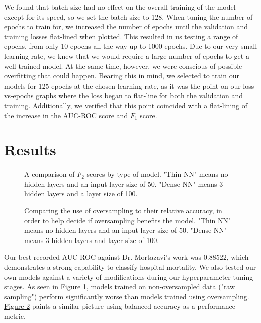 \documentclass{article}
\begin{document}
We found that batch size had no effect on the overall training of the model except for its speed, so we set the batch size to 128. When 
tuning the number of epochs to train for, we increased the number of epochs until the validation and training losses flat-lined when 
plotted. This resulted in us testing a range of epochs, from only 10 epochs all the way up to 1000 epochs. Due to our very small learning
rate, we knew that we would require a large number of epochs to get a well-trained model. At the same time, however, we were conscious of 
possible overfitting that could happen. Bearing this in mind, we selected to train our models for 125 epochs at the chosen learning rate,
as it was the point on our loss-vs-epochs graphs where the loss began to flat-line for both the validation and training. Additionally, we 
verified that this point coincided with a flat-lining of the increase in the AUC-ROC score and $F_1$ score.


\section{Results}
\begin{figure}[h]
    \noindent{}
    \caption{A comparison of $F_2$ scores by type of model. "Thin NN" means no hidden layers and an input layer size of 50. "Dense NN" means 3 hidden layers and a layer size of 100.}
    \label{fig:1}
\end{figure}


\begin{figure}[H]
    \centering
    \noindent{}
    \caption{Comparing the use of oversampling to their relative accuracy, in order to help decide if oversampling benefits the model. "Thin NN" means no hidden layers and an input layer size of 50. "Dense NN" means 3 hidden layers and layer size of 100.}
    \label{fig:2}
\end{figure}

Our best recorded AUC-ROC against Dr. Mortazavi's work was 0.88522, which demonstrates a strong capability to classify hospital mortality.
We also tested our own models against a variety of modifications during our hyperparameter tuning stages. 
As seen in \hyperref[fig:1]{Figure 1}, models trained on non-oversampled data ("raw sampling") perform significantly worse than models 
trained using oversampling. \hyperref[fig:2]{Figure 2} paints a similar picture using balanced accuracy as a performance metric. 
\end{document}
